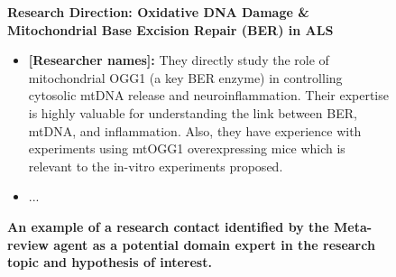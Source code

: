 \begin{figure}[htbp!]
\begin{tcolorbox}[
    colback=black!5!white,
    colframe=black!60!white,
    title=\textbf{Example of research contact identification by the Meta-review agent},
    fonttitle=\bfseries,
    arc=3mm,
    boxrule=1pt,
    bottomrule=2pt,
]
\footnotesize
\textbf{Research Direction: Oxidative DNA Damage \& Mitochondrial Base Excision Repair (BER) in ALS}
\begin{itemize}
    \item \textbf{[Researcher names]:} They directly study the role of mitochondrial OGG1 (a key BER enzyme) in controlling cytosolic mtDNA release and neuroinflammation. Their expertise is highly valuable for understanding the link between BER, mtDNA, and inflammation. Also, they have experience with experiments using mtOGG1 overexpressing mice which is relevant to the in-vitro experiments proposed.
    \item ...
\end{itemize}
\end{tcolorbox}
\vspace{0.1cm}
\caption{\textbf{An example of a research contact identified by the Meta-review agent as a potential domain expert in the research topic and hypothesis of interest.}}
\label{fig:ex_contact}
\end{figure}

